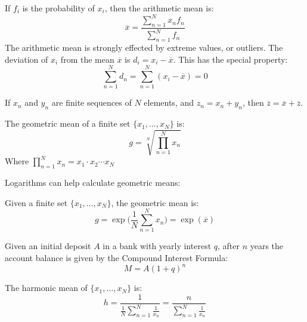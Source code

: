 \documentclass[crop=false,class=book,oneside]{standalone}                      %
\begin{document}
        If $f_{i}$ is the probability of $x_{i}$, then the arithmetic mean is:
        \begin{equation*}
            \overline{x}=
            \frac{\sum_{n=1}^{N}x_{n}f_{n}}{\sum_{n=1}^{N}f_{n}}
        \end{equation*}
        The arithmetic mean is strongly effected by extreme values, or outliers.
        The deviation of $x_{i}$ from the mean $\overline{x}$
        is $d_{i}=x_{i}-\overline{x}$. This has the special property:
        \begin{equation*}
            \sum_{n=1}^{N}d_{n}
            =\sum_{n=1}^{N}(x_{i}-\overline{x})
            =0
        \end{equation*}
        \begin{theorem}
            If $x_{n}$ and $y_{n}$ are finite sequences of
            $N$ elements, and $z_{n}=x_{n}+y_{n}$, then
            $\overline{z}=\overline{x}+\overline{z}$.
        \end{theorem}
        \begin{definition}
            The geometric mean of a finite set
            $\{x_{1},\hdots,x_{N}\}$ is:
            \begin{equation*}
                g=\sqrt[N]{\prod_{n=1}^{N}x_{n}}
            \end{equation*}
            Where
            $\prod_{n=1}^{N}x_{n}=x_{1}\cdot{x_{2}}\cdots{x_{N}}$
        \end{definition}
        Logarithms can help calculate geometric means:
        \begin{theorem}
            Given a finite set $\{x_{1},\hdots,x_{N}\}$,
            the geometric mean is:
            \begin{equation*}
                g=\exp\Big(\frac{1}{N}\sum_{n=1}^{N}x_{n}\Big)
                =\exp(\overline{x})
            \end{equation*}
        \end{theorem}
        Given an initial deposit $A$ in a bank with yearly interest $q$,
        after $n$ years the account balance is given by the
        Compound Interest Formula:
        \begin{equation*}
            M=A(1+q)^{n}
        \end{equation*}
        \begin{definition}
            The harmonic mean of $\{x_{1},\hdots,x_{N}\}$
            is:
            \begin{equation*}
                h=\frac{1}{\frac{1}{N}\sum_{n=1}^{N}\frac{1}{x_{n}}}
                =\frac{n}{\sum_{n=1}^{N}\frac{1}{x_{n}}}
            \end{equation*}
        \end{definition}
\end{document}
